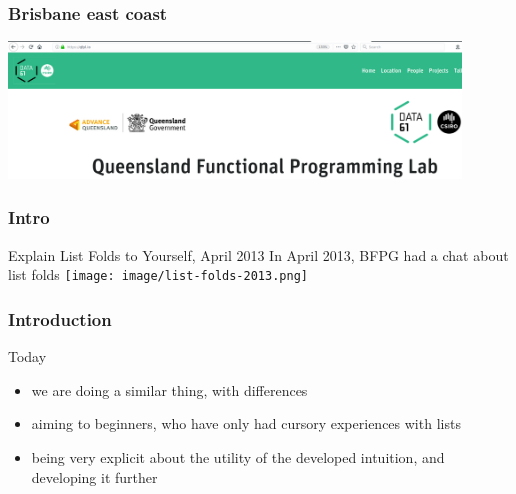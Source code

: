 \begin{frame}
\frametitle{Brisbane east coast}
\begin{center}
\includegraphics[width=0.9\textwidth]{image/qfpl_io.png}
\end{center}
\end{frame}

\begin{frame}
\frametitle{Intro}
\begin{block}{Explain List Folds to Yourself, April 2013}
In April 2013, BFPG had a chat about list folds
\texttt{[image: image/list-folds-2013.png]}
\end{block}
\end{frame}

\begin{frame}
\frametitle{Introduction}
\begin{block}{Today}
\begin{itemize}
\item<1-> we are doing a similar thing, with differences
\item<2-> aiming to beginners, who have only had cursory experiences with lists
\item<3-> being very explicit about the utility of the developed intuition, and developing it further
\end{itemize}
\end{block}
\end{frame}
